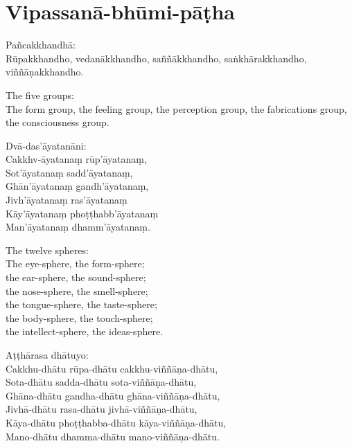 \section{Vipassanā-bhūmi-pāṭha}



Pañcakkhandhā:\\
Rūpakkhandho, vedanākkhandho, saññākkhandho, saṅkhārakkhandho, viññāṇakkhandho.

\begin{english}
  The five groups:\\
  The form group, the feeling group, the perception group, the fabrications
  group, the consciousness group.
\end{english}

Dvā-das'āyatanāni:\\
Cakkhv-āyatanaṃ rūp'āyatanaṃ,\\
Sot'āyatanaṃ sadd'āyatanaṃ,\\
Ghān'āyatanaṃ gandh'āyatanaṃ,\\
Jivh'āyatanaṃ ras'āyatanaṃ\\
Kāy'āyatanaṃ phoṭṭhabb'āyatanaṃ\\
Man'āyatanaṃ dhamm'āyatanaṃ.

\begin{english}
  The twelve spheres:\\
  The eye-sphere, the form-sphere;\\
  the ear-sphere, the sound-sphere;\\
  the nose-sphere, the smell-sphere;\\
  the tongue-sphere, the taste-sphere;\\
  the body-sphere, the touch-sphere;\\
  the intellect-sphere, the ideas-sphere.
\end{english}

Aṭṭhārasa dhātuyo:\\
Cakkhu-dhātu rūpa-dhātu cakkhu-viññāṇa-dhātu,\\
Sota-dhātu sadda-dhātu sota-viññāṇa-dhātu,\\
Ghāna-dhātu gandha-dhātu ghāna-viññāṇa-dhātu,\\
Jivhā-dhātu rasa-dhātu jivhā-viññāṇa-dhātu,\\
Kāya-dhātu phoṭṭhabba-dhātu kāya-viññāṇa-dhātu,\\
Mano-dhātu dhamma-dhātu mano-viññāṇa-dhātu.


